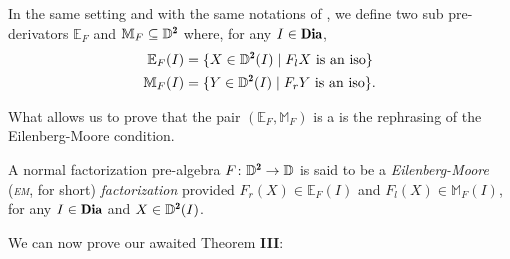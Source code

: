\begin{definition} \label{def_EF_MF}
In the same setting and with the same notations of \adef{}, we define two sub pre-derivators $\mathbb E_F$ and $\mathbb M_F\subseteq \D^{\due}$ where, for any $I\in \Dia$, 
\begin{align}
\mathbb{E}_F(I)&=\{X\in \D^{\due}(I)\mid F_{l}X\text{ is an iso}\}\notag\\ 
\mathbb{M}_F(I)&=\{Y\in \D^{\due}(I)\mid F_{r}Y\text{ is an iso}\}.
\end{align}
\end{definition}
What allows us to prove that the pair $(\mathbb E_F,\mathbb M_F)$ is a \dfs is the rephrasing of the Eilenberg\hyp{}Moore condition.
\begin{definition}\label{def_EM_algebra}
A normal factorization pre\hyp{}algebra $F\colon \D^\due\to \D$ is said to be a \emph{Eilenberg\hyp{}Moore} (\emph{\textsc{em}}, for short) \emph{factorization} provided $F_r(X)\in \mathbb E_F(I)$ and  $F_l(X)\in \mathbb M_F(I)$, for any $I\in\Dia$ and $X\in \D^\due(I)$.
\end{definition}
We can now prove our awaited Theorem \textbf{III}:
